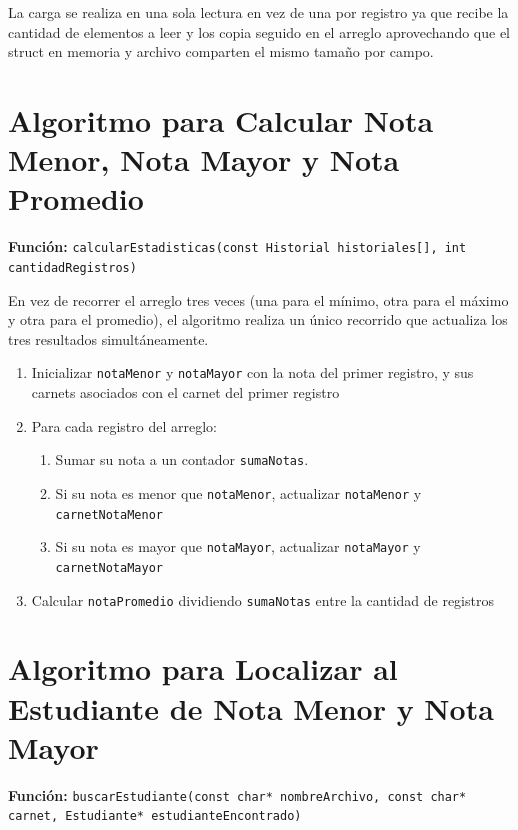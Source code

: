 \documentclass[12pt,letterpaper]{article}
\begin{document}
La carga se realiza en una sola lectura en vez de una por registro ya que recibe la cantidad de elementos a leer y los copia
seguido en el arreglo aprovechando que el struct en memoria y archivo comparten el mismo tamaño por campo.

\section{Algoritmo para Calcular Nota Menor, Nota Mayor y Nota Promedio}
\textbf{Función:} \texttt{calcularEstadisticas(const Historial historiales[], int cantidadRegistros)}

En vez de recorrer el arreglo tres veces (una para el mínimo, otra para el máximo y otra para el promedio), 
el algoritmo realiza un único recorrido que actualiza los tres resultados simultáneamente.

\begin{enumerate}
    \item Inicializar \texttt{notaMenor} y \texttt{notaMayor} con la nota del primer registro, y sus carnets asociados con el carnet del primer registro
    \item Para cada registro del arreglo:
    \begin{enumerate}
        \item Sumar su nota a un contador \texttt{sumaNotas}.
        \item Si su nota es menor que \texttt{notaMenor}, actualizar \texttt{notaMenor} y \texttt{carnetNotaMenor}
        \item Si su nota es mayor que \texttt{notaMayor}, actualizar \texttt{notaMayor} y \texttt{carnetNotaMayor}
    \end{enumerate}
    \item Calcular \texttt{notaPromedio} dividiendo \texttt{sumaNotas} entre la cantidad de registros
\end{enumerate}

\section{Algoritmo para Localizar al Estudiante de Nota Menor y Nota Mayor}
\textbf{Función:} \texttt{buscarEstudiante(const char* nombreArchivo, const char* carnet, Estudiante* estudianteEncontrado)}
\end{document}
